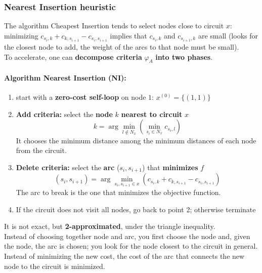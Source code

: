 \newpage

\subsubsection{Nearest Insertion heuristic}
The algorithm Cheapest Insertion tends to select nodes close to circuit $x$: minimizing $c_{s_i ,k} + c_{k,s_{i+1}} - c_{s_i ,s_{i+1}}$ implies that $c_{s_i ,k}$ and $c_{s_{i+1},k}$ are small (looks for the closest node to add, the weight of the arcs to that node must be small).\\

To accelerate, one can \textbf{decompose criteria} $\varphi_A$ \textbf{into two phases}.\\

\paragraph{Algorithm Nearest Insertion (NI):}
\begin{enumerate}
	\item start with a \textbf{zero-cost self-loop} on node $1$: $x^{(0)} = \{(1, 1)\}$
	
	\item \textbf{Add criteria:} select the \textbf{node} $k$ \textbf{nearest to circuit} $x$
	$$ k = \arg \min_{l \notin N_x} \left(\min_{s_i \in N_x} c_{s_i, l} \right) $$
	It chooses the minimum distance among the minimum distances of each node from the circuit.
	
	\item \textbf{Delete criteria:} select the \textbf{arc} ($s_i , s_{i+1}$) that \textbf{minimizes} $f$
	$$ (s_i, s_{i+1}) = \arg \min_{s_i, s_{i+1} \in x} \left(c_{s_i, k} + c_{k, s_{i+1}} - c_{s_i, s_{i+1}}\right) $$
	The arc to break is the one that minimizes the objective function.
	
	\item If the circuit does not visit all nodes, go back to point 2; otherwise terminate
\end{enumerate}

It is not exact, but \textbf{2-approximated}, under the triangle inequality.\\

Instead of choosing together node and arc, you first choose the node and, given the node, the arc is chosen; you look for the node closest to the circuit in general. \\
Instead of minimizing the new cost, the cost of the arc that connects the new node to the circuit is minimized.\\

